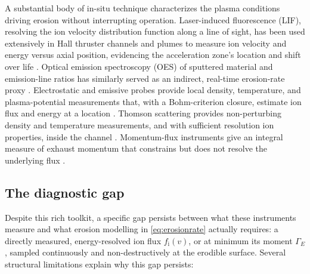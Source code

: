 A substantial body of in-situ technique characterizes the plasma conditions driving erosion without interrupting operation. Laser-induced fluorescence (LIF), resolving the ion velocity distribution function along a line of sight, has been used extensively in Hall thruster channels and plumes to measure ion velocity and energy versus axial position, evidencing the acceleration zone's location and shift over life \cite{ref0322,ref0347}. Optical emission spectroscopy (OES) of sputtered material and emission-line ratios has similarly served as an indirect, real-time erosion-rate proxy \cite{ref0257}. Electrostatic and emissive probes provide local density, temperature, and plasma-potential measurements that, with a Bohm-criterion closure, estimate ion flux and energy at a location \cite{ref0226,ref0490}. Thomson scattering provides non-perturbing density and temperature measurements, and with sufficient resolution ion properties, inside the channel \cite{ref0356}. Momentum-flux instruments give an integral measure of exhaust momentum that constrains but does not resolve the underlying flux \cite{ref0511}.

\subsection{The diagnostic gap}

Despite this rich toolkit, a specific gap persists between what these instruments measure and what erosion modelling in \cref{eq:erosionrate} actually requires: a directly measured, energy-resolved ion flux $f_{\mathrm{i}}(v)$, or at minimum its moment $\Gamma_{E}$, sampled continuously and non-destructively at the erodible surface. Several structural limitations explain why this gap persists:

